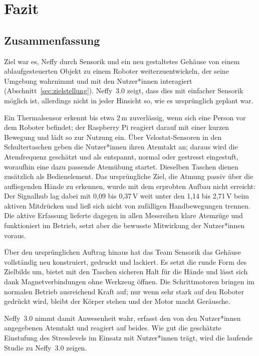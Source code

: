 \chapter{Fazit}
\label{kap:fazit}

\section{Zusammenfassung}
\label{sec:zusammenfassung}

Ziel war es, Neffy durch Sensorik und ein neu gestaltetes Gehäuse von einem
ablaufgesteuerten Objekt zu einem Roboter weiterzuentwickeln, der seine Umgebung wahrnimmt und
mit den Nutzer*innen interagiert (Abschnitt~\ref{sec:zielstellung}).
Neffy~3.0 zeigt, dass dies mit einfacher Sensorik möglich ist, allerdings
nicht in jeder Hinsicht so, wie es ursprünglich geplant war.

Ein Thermalsensor erkennt bis etwa 2\,m zuverlässig, wenn sich eine Person vor dem Roboter
befindet; der Raspberry Pi
reagiert darauf mit einer kurzen Bewegung und lädt so zur Nutzung ein. Über Velostat-Sensoren
in den Schultertaschen geben die Nutzer*innen ihren Atemtakt an; daraus wird die Atemfrequenz
geschätzt und als entspannt, normal oder gestresst eingestuft, woraufhin eine dazu passende
Atemübung startet. Dieselben Taschen dienen zusätzlich als
Bedienelement. Das ursprüngliche Ziel, die Atmung passiv über die aufliegenden Hände zu
erkennen, wurde mit dem erprobten Aufbau nicht erreicht: Der Signalhub lag dabei mit 0{,}09 bis 0{,}37\,V weit
unter den 1{,}14 bis 2{,}71\,V beim aktiven Mitdrücken und ließ sich nicht von
zufälligen Handbewegungen trennen. Die aktive Erfassung lieferte dagegen in allen Messreihen
klare Atemzüge und funktioniert im Betrieb, setzt aber die bewusste Mitwirkung der
Nutzer*innen voraus.

Über den ursprünglichen Auftrag hinaus hat das Team Sensorik das Gehäuse vollständig neu
konstruiert, gedruckt und lackiert. Es setzt die runde Form des Zielbilds um, bietet mit den
Taschen sicheren Halt für die Hände und lässt sich dank Magnetverbindungen ohne Werkzeug
öffnen. Die Schrittmotoren bringen im normalen Betrieb ausreichend Kraft auf; nur wenn sehr
stark auf den Roboter gedrückt wird, bleibt der Körper stehen und der Motor macht Geräusche.

Neffy~3.0 nimmt damit Anwesenheit wahr, erfasst den von den Nutzer*innen angegebenen
Atemtakt und reagiert auf beides. Wie gut die geschätzte Einstufung des Stresslevels im Einsatz
mit Nutzer*innen trägt, wird die laufende Studie zu Neffy~3.0 zeigen.

